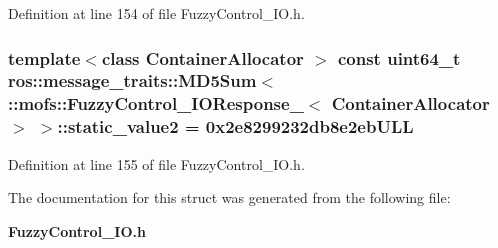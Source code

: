 Definition at line 154 of file Fuzzy\-Control\-\_\-\-I\-O.\-h.

\subsubsection[{static\-\_\-value2}]{\setlength{\rightskip}{0pt plus 5cm}template$<$class Container\-Allocator $>$ const uint64\-\_\-t ros\-::message\-\_\-traits\-::\-M\-D5\-Sum$<$ \-::{\bf mofs\-::\-Fuzzy\-Control\-\_\-\-I\-O\-Response\-\_\-}$<$ Container\-Allocator $>$ $>$\-::static\-\_\-value2 = 0x2e8299232db8e2eb\-U\-L\-L\hspace{0.3cm}{\ttfamily [static]}}\label{structros_1_1message__traits_1_1MD5Sum_3_01_1_1mofs_1_1FuzzyControl__IOResponse___3_01ContainerAllocator_01_4_01_4_a3d39b14f02ad2136f388a81eb466b897}


Definition at line 155 of file Fuzzy\-Control\-\_\-\-I\-O.\-h.



The documentation for this struct was generated from the following file\-:\begin{DoxyCompactItemize}
\item 
{\bf Fuzzy\-Control\-\_\-\-I\-O.\-h}\end{DoxyCompactItemize}
